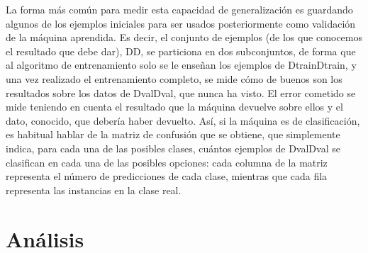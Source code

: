 \documentclass[12pt,a4paper]{report}
\begin{document}
La forma más común para medir esta capacidad de generalización es guardando algunos de los ejemplos iniciales para ser usados posteriormente como validación de la máquina aprendida. Es decir, el conjunto de ejemplos (de los que conocemos el resultado que debe dar), DD, se particiona en dos subconjuntos, de forma que al algoritmo de entrenamiento solo se le enseñan los ejemplos de DtrainDtrain, y una vez realizado el entrenamiento completo, se mide cómo de buenos son los resultados sobre los datos de DvalDval, que nunca ha visto. El error cometido se mide teniendo en cuenta el resultado que la máquina devuelve sobre ellos y el dato, conocido, que debería haber devuelto.
Así, si la máquina es de clasificación, es habitual hablar de la matriz de confusión que se obtiene, que simplemente indica, para cada una de las posibles clases, cuántos ejemplos de DvalDval se clasifican en cada una de las posibles opciones: cada columna de la matriz representa el número de predicciones de cada clase, mientras que cada fila representa las instancias en la clase real. 


\newpage
\section{Análisis}
\end{document}
